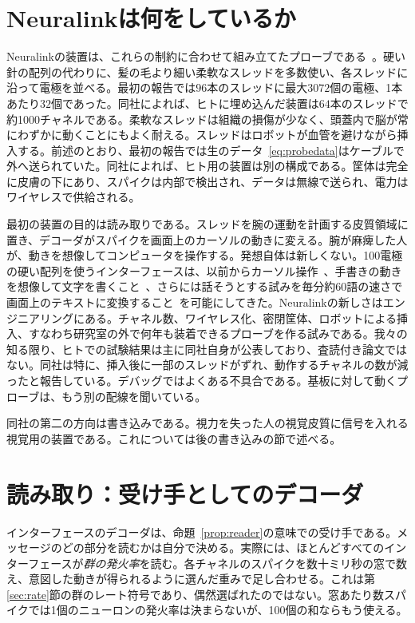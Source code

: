 \section{Neuralinkは何をしているか}

Neuralinkの装置は、これらの制約に合わせて組み立てたプローブである~\cite{Musk2019}。硬い針の配列の代わりに、髪の毛より細い柔軟なスレッドを多数使い、各スレッドに沿って電極を並べる。最初の報告では$96$本のスレッドに最大$3072$個の電極、1本あたり$32$個であった。同社によれば、ヒトに埋め込んだ装置は$64$本のスレッドで約1000チャネルである。柔軟なスレッドは組織の損傷が少なく、頭蓋内で脳が常にわずかに動くことにもよく耐える。スレッドはロボットが血管を避けながら挿入する。前述のとおり、最初の報告では生のデータ~\eqref{eq:probedata}はケーブルで外へ送られていた。同社によれば、ヒト用の装置は別の構成である。筐体は完全に皮膚の下にあり、スパイクは内部で検出され、データは無線で送られ、電力はワイヤレスで供給される。

最初の装置の目的は読み取りである。スレッドを腕の運動を計画する皮質領域に置き、デコーダがスパイクを画面上のカーソルの動きに変える。腕が麻痺した人が、動きを想像してコンピュータを操作する。発想自体は新しくない。100電極の硬い配列を使うインターフェースは、以前からカーソル操作~\cite{Hochberg2006}、手書きの動きを想像して文字を書くこと~\cite{Willett2021}、さらには話そうとする試みを毎分約60語の速さで画面上のテキストに変換すること~\cite{Willett2023}を可能にしてきた。Neuralinkの新しさはエンジニアリングにある。チャネル数、ワイヤレス化、密閉筐体、ロボットによる挿入、すなわち研究室の外で何年も装着できるプローブを作る試みである。我々の知る限り、ヒトでの試験結果は主に同社自身が公表しており、査読付き論文ではない。同社は特に、挿入後に一部のスレッドがずれ、動作するチャネルの数が減ったと報告している。デバッグではよくある不具合である。基板に対して動くプローブは、もう別の配線を聞いている。

同社の第二の方向は書き込みである。視力を失った人の視覚皮質に信号を入れる視覚用の装置である。これについては後の書き込みの節で述べる。

\section{読み取り：受け手としてのデコーダ}

インターフェースのデコーダは、命題~\ref{prop:reader}の意味での受け手である。メッセージのどの部分を読むかは自分で決める。実際には、ほとんどすべてのインターフェースが\emph{群の発火率}を読む。各チャネルのスパイクを数十ミリ秒の窓で数え、意図した動きが得られるように選んだ重みで足し合わせる。これは第\ref{sec:rate}節の群のレート符号であり、偶然選ばれたのではない。窓あたり数スパイクでは1個のニューロンの発火率は決まらないが、100個の和ならもう使える。

